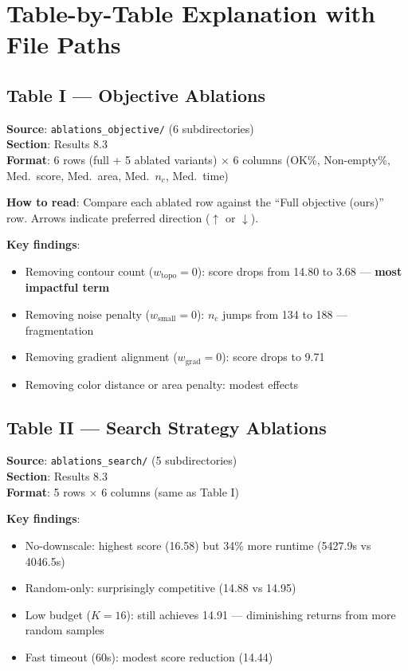 \documentclass[11pt,a4paper]{article}
\newcommand{\filepath}[1]{\texttt{\small #1}}
\begin{document}
\section{Table-by-Table Explanation with File Paths}

\subsection{Table I --- Objective Ablations}
\textbf{Source}: \filepath{ablations\_objective/} (6 subdirectories)\\
\textbf{Section}: Results 8.3\\
\textbf{Format}: 6 rows (full + 5 ablated variants) $\times$ 6 columns (OK\%, Non-empty\%, Med.\ score, Med.\ area, Med.\ $n_c$, Med.\ time)

\textbf{How to read}: Compare each ablated row against the ``Full objective (ours)'' row.  Arrows indicate preferred direction ($\uparrow$ or $\downarrow$).

\textbf{Key findings}:
\begin{itemize}[nosep]
  \item Removing contour count ($w_{\mathrm{topo}}=0$): score drops from 14.80 to 3.68 --- \textbf{most impactful term}
  \item Removing noise penalty ($w_{\mathrm{small}}=0$): $n_c$ jumps from 134 to 188 --- fragmentation
  \item Removing gradient alignment ($w_{\mathrm{grad}}=0$): score drops to 9.71
  \item Removing color distance or area penalty: modest effects
\end{itemize}

\subsection{Table II --- Search Strategy Ablations}
\textbf{Source}: \filepath{ablations\_search/} (5 subdirectories)\\
\textbf{Section}: Results 8.3\\
\textbf{Format}: 5 rows $\times$ 6 columns (same as Table I)

\textbf{Key findings}:
\begin{itemize}[nosep]
  \item No-downscale: highest score (16.58) but 34\% more runtime (5427.9s vs 4046.5s)
  \item Random-only: surprisingly competitive (14.88 vs 14.95)
  \item Low budget ($K=16$): still achieves 14.91 --- diminishing returns from more random samples
  \item Fast timeout (60s): modest score reduction (14.44)
\end{itemize}
\end{document}
